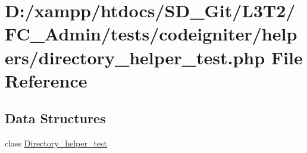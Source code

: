 \hypertarget{directory__helper__test_8php}{}\section{D\+:/xampp/htdocs/\+S\+D\+\_\+\+Git/\+L3\+T2/\+F\+C\+\_\+\+Admin/tests/codeigniter/helpers/directory\+\_\+helper\+\_\+test.php File Reference}
\label{directory__helper__test_8php}
\subsection*{Data Structures}
\begin{DoxyCompactItemize}
\item 
class \hyperlink{class_directory__helper__test}{Directory\+\_\+helper\+\_\+test}
\end{DoxyCompactItemize}
